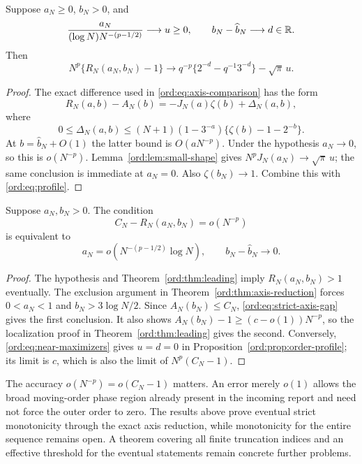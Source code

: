\begin{proposition}
\label{ord:prop:order-profile}
Suppose $a_N\ge0$, $b_N>0$, and
\[
 \frac{a_N}{(\log N)N^{-(p-1/2)}}\longrightarrow u\ge0,
 \qquad b_N-\widehat b_N\longrightarrow d\in\mathbb R.
\]
Then
\begin{equation}\label{ord:eq:order-profile}
 N^p\{R_N(a_N,b_N)-1\}
 \longrightarrow
 q^{-p}\{2^{-d}-q^{-1}3^{-d}\}-\sqrt\pi\,u.
\end{equation}
\end{proposition}
\begin{proof}
The exact difference used in \eqref{ord:eq:axis-comparison} has the form
\[
 R_N(a,b)-A_N(b)=-J_N(a)\zeta(b)+\Delta_N(a,b),
\]
where
\[
 0\le\Delta_N(a,b)\le
 (N+1)(1-3^{-a})\{\zeta(b)-1-2^{-b}\}.
\]
At $b=\widehat b_N+O(1)$ the latter bound is $O(aN^{-p})$.
Under the hypothesis $a_N\to0$, so this is $o(N^{-p})$.
Lemma~\ref{ord:lem:small-shape} gives
$N^pJ_N(a_N)\to\sqrt\pi\,u$; the same conclusion is immediate at
$a_N=0$. Also $\zeta(b_N)\to1$. Combine this with
\eqref{ord:eq:profile}.
\end{proof}



\begin{corollary}
\label{ord:cor:near-maximizers}
Suppose $a_N,b_N>0$. The condition
\[
 C_N-R_N(a_N,b_N)=o(N^{-p})
\]
is equivalent to
\begin{equation}\label{ord:eq:near-maximizers}
 a_N=o\!\left(N^{-(p-1/2)}\log N\right),\qquad
 b_N-\widehat b_N\longrightarrow0.
\end{equation}
\end{corollary}
\begin{proof}
The hypothesis and Theorem~\ref{ord:thm:leading} imply
$R_N(a_N,b_N)>1$ eventually. The exclusion argument in
Theorem~\ref{ord:thm:axis-reduction} forces $0<a_N<1$ and
$b_N>3\log N/2$. Since $A_N(b_N)\le C_N$,
\eqref{ord:eq:strict-axis-gap} gives the first conclusion.
It also shows $A_N(b_N)-1\ge(c-o(1))N^{-p}$, so the localization proof
in Theorem~\ref{ord:thm:leading} gives the second.
Conversely, \eqref{ord:eq:near-maximizers} gives $u=d=0$ in
Proposition~\ref{ord:prop:order-profile}; its limit is $c$, which is also
the limit of $N^p(C_N-1)$.
\end{proof}

The accuracy $o(N^{-p})=o(C_N-1)$ matters. An error merely $o(1)$
allows the broad moving-order phase region already present in the
incoming report and need not force the outer order to zero. The results
above prove eventual strict monotonicity through the exact axis reduction,
while monotonicity for the entire sequence remains open. A theorem covering
all finite truncation indices and an effective threshold for the eventual
statements remain concrete further problems.

